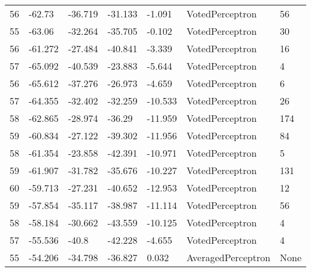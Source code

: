 \begin{tabular}{lllllll}
56 &  -62.73 & -36.719 & -31.133 &  -1.091 &    VotedPerceptron &   56 \\
55 &  -63.06 & -32.264 & -35.705 &  -0.102 &    VotedPerceptron &   30 \\
56 & -61.272 & -27.484 & -40.841 &  -3.339 &    VotedPerceptron &   16 \\
57 & -65.092 & -40.539 & -23.883 &  -5.644 &    VotedPerceptron &    4 \\
56 & -65.612 & -37.276 & -26.973 &  -4.659 &    VotedPerceptron &    6 \\
57 & -64.355 & -32.402 & -32.259 & -10.533 &    VotedPerceptron &   26 \\
58 & -62.865 & -28.974 &  -36.29 & -11.959 &    VotedPerceptron &  174 \\
59 & -60.834 & -27.122 & -39.302 & -11.956 &    VotedPerceptron &   84 \\
58 & -61.354 & -23.858 & -42.391 & -10.971 &    VotedPerceptron &    5 \\
59 & -61.907 & -31.782 & -35.676 & -10.227 &    VotedPerceptron &  131 \\
60 & -59.713 & -27.231 & -40.652 & -12.953 &    VotedPerceptron &   12 \\
59 & -57.854 & -35.117 & -38.987 & -11.114 &    VotedPerceptron &   56 \\
58 & -58.184 & -30.662 & -43.559 & -10.125 &    VotedPerceptron &    4 \\
57 & -55.536 &   -40.8 & -42.228 &  -4.655 &    VotedPerceptron &    4 \\
55 & -54.206 & -34.798 & -36.827 &   0.032 & AveragedPerceptron & None \\
\bottomrule
\end{tabular}
